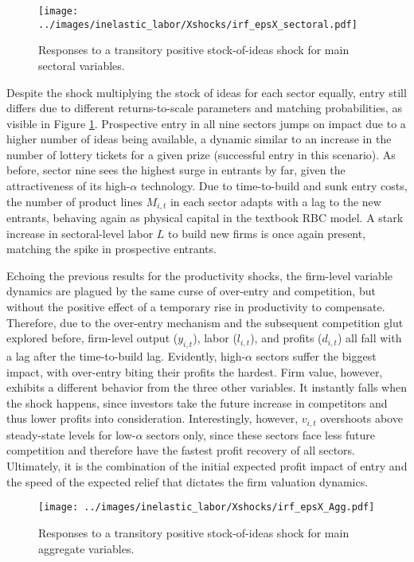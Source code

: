 \documentclass[a4paper,12pt]{article} %
\numberwithin{equation}{section} %
\numberwithin{figure}{section}
\numberwithin{table}{section}
\begin{document}
\begin{figure}[H]
  \centering
  \texttt{[image: ../images/inelastic\_labor/Xshocks/irf\_epsX\_sectoral.pdf]}
  \caption{Responses to a transitory positive stock-of-ideas shock for main sectoral variables.}
  \label{fig:multistock}
\end{figure}

Despite the shock multiplying the stock of ideas for each sector equally, entry still differs due to different returns-to-scale parameters
and matching probabilities, as visible in Figure \ref{fig:multistock}. Prospective entry in all nine sectors jumps on impact due to a higher
number of ideas being available, a dynamic similar to an increase in the number of lottery tickets for a given prize (successful entry in
this scenario). As before, sector nine sees the highest surge in entrants by far, given the attractiveness of its high-$\alpha$ technology.
Due to time-to-build and sunk entry costs, the number of product lines $M_{i,t}$ in each sector adapts with a lag to the new entrants, behaving
again as physical capital in the textbook RBC model. A stark increase in sectoral-level labor $L$ to build new firms is once again present,
matching the spike in prospective entrants.

Echoing the previous results for the productivity shocks, the firm-level variable dynamics are plagued by the same curse of over-entry
and competition, but without the positive effect of a temporary rise in productivity to compensate. Therefore, due to the over-entry mechanism
and the subsequent competition glut explored before, firm-level output ($y_{i,t}$), labor ($l_{i,t}$), and profits ($d_{i,t}$) all fall with a lag after the
time-to-build lag. Evidently, high-$\alpha$ sectors suffer the biggest impact, with over-entry biting their profits the hardest. Firm value,
however, exhibits a different behavior from the three other variables. It instantly falls when the shock happens, since investors take the future
increase in competitors and thus lower profits into consideration. Interestingly, however, $v_{i,t}$ overshoots above steady-state levels for low-$\alpha$
sectors only, since these sectors face less future competition and therefore have the fastest profit recovery of all sectors. Ultimately, it is
the combination of the initial expected profit impact of entry and the speed of the expected relief that dictates the firm valuation dynamics.

\begin{figure}[H]
  \centering
  \texttt{[image: ../images/inelastic\_labor/Xshocks/irf\_epsX\_Agg.pdf]}
  \caption{Responses to a transitory positive stock-of-ideas shock for main aggregate variables.}
  \label{fig:aggstock}
\end{figure}
\end{document}
